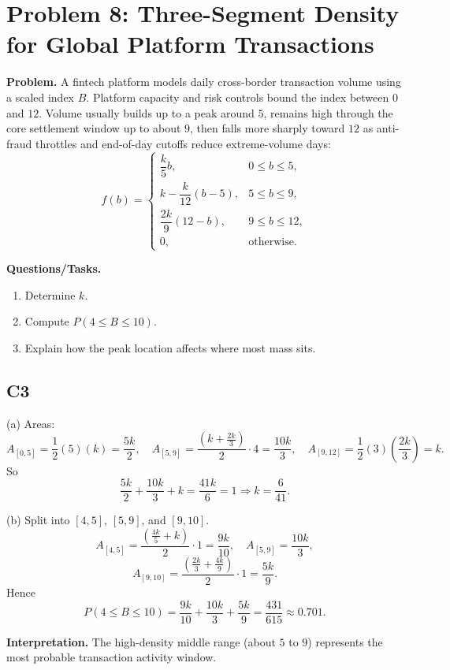 \section{Problem 8: Three-Segment Density for Global Platform Transactions}

\textbf{Problem.}
A fintech platform models daily cross-border transaction volume using a scaled index $B$. Platform capacity and risk controls bound the index between $0$ and $12$. Volume usually builds up to a peak around $5$, remains high through the core settlement window up to about $9$, then falls more sharply toward $12$ as anti-fraud throttles and end-of-day cutoffs reduce extreme-volume days:
\[
f(b)=\begin{cases}
\dfrac{k}{5}b, & 0\le b\le 5,\\
k-\dfrac{k}{12}(b-5), & 5\le b\le 9,\\
\dfrac{2k}{9}(12-b), & 9\le b\le 12,\\
0, & \text{otherwise.}
\end{cases}
\]

\textbf{Questions/Tasks.}
\begin{enumerate}[label=(\alph*)]
\item Determine $k$.
\item Compute $P(4\le B\le 10)$.
\item Explain how the peak location affects where most mass sits.
\end{enumerate}

\subsection*{C3}
(a) Areas:
\[
A_{[0,5]}=\frac12(5)(k)=\frac{5k}{2},
\quad
A_{[5,9]}=\frac{(k+\frac{2k}{3})}{2}\cdot4=\frac{10k}{3},
\quad
A_{[9,12]}=\frac12(3)\left(\frac{2k}{3}\right)=k.
\]
So
\[
\frac{5k}{2}+\frac{10k}{3}+k=\frac{41k}{6}=1
\Rightarrow k=\frac{6}{41}.
\]

(b) Split into $[4,5]$, $[5,9]$, and $[9,10]$.
\[
A_{[4,5]}=\frac{\left(\frac{4k}{5}+k\right)}{2}\cdot1=\frac{9k}{10},
\quad
A_{[5,9]}=\frac{10k}{3},
\]
\[
A_{[9,10]}=\frac{\left(\frac{2k}{3}+\frac{4k}{9}\right)}{2}\cdot1=\frac{5k}{9}.
\]
Hence
\[
P(4\le B\le 10)=\frac{9k}{10}+\frac{10k}{3}+\frac{5k}{9}=\frac{431}{615}\approx0.701.
\]

\textbf{Interpretation.}
The high-density middle range (about $5$ to $9$) represents the most probable transaction activity window.

